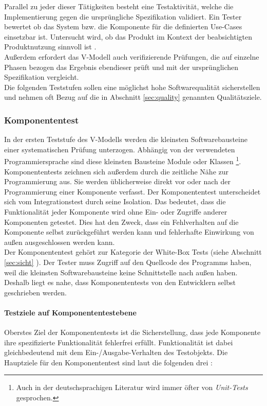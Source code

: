 Parallel zu jeder dieser Tätigkeiten besteht eine Testaktivität, welche die Implementierung gegen die ursprüngliche Spezifikation validiert. Ein Tester bewertet ob das System bzw. die Komponente für die definierten Use-Cases einsetzbar ist. Untersucht wird, ob das Produkt im Kontext der beabsichtigten Produktnutzung sinnvoll ist \cite{spillner_basiswissen_2012}.\\
Außerdem erfordert das V-Modell auch verifizierende Prüfungen, die auf einzelne Phasen bezogen das Ergebnis ebendieser prüft und mit der ursprünglichen Spezifikation vergleicht.\\
Die folgenden Teststufen sollen eine möglichst hohe Softwarequalität sicherstellen und nehmen oft Bezug auf die in Abschnitt \ref{sec:quality} genannten Qualitätsziele.

\subsubsection{Komponententest}
\label{sec:unit_test}
In der ersten Teststufe des V-Modells werden die kleinsten Softwarebausteine einer systematischen Prüfung unterzogen. Abhängig von der verwendeten Programmiersprache sind diese kleinsten Bausteine Module oder Klassen \footnote{Auch in der deutschsprachigen Literatur wird immer öfter von \textit{Unit-Tests} gesprochen.}.\\
Komponententests zeichnen sich außerdem durch die zeitliche Nähe zur Programmierung aus. Sie werden üblicherweise direkt vor oder nach der Programmierung einer Komponente verfasst. Der Komponententest unterscheidet sich vom Integrationstest durch seine Isolation. Das bedeutet, dass die Funktionalität jeder Komponente wird ohne Ein- oder Zugriffe anderer Komponenten getestet. Dies hat den Zweck, dass ein Fehlverhalten auf die Komponente selbst zurückgeführt werden kann und fehlerhafte Einwirkung von außen ausgeschlossen werden kann.\\
Der Komponententest gehört zur Kategorie der White-Box Tests (siehe Abschnitt \ref{sec:sicht} ). Der Tester muss Zugriff auf den Quellcode des Programms haben, weil die kleinsten Softwarebausteine keine Schnittstelle nach außen haben. Deshalb liegt es nahe, dass Komponententests von den Entwicklern selbst geschrieben werden.

\paragraph{Testziele auf Komponententestebene}
Oberstes Ziel der Komponententests ist die Sicherstellung, dass jede Komponente ihre spezifizierte Funktionalität fehlerfrei erfüllt. Funktionalität ist dabei gleichbedeutend mit dem Ein-/Ausgabe-Verhalten des Testobjekts. Die Hauptziele für den Komponententest sind laut \citeauthor{spillner_basiswissen_2012} die folgenden drei \cite{spillner_basiswissen_2012}:

